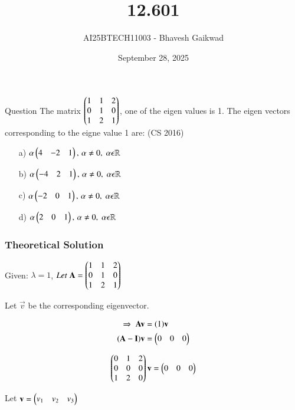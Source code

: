 \documentclass{beamer}
\title
{12.601}
\date{September 28, 2025}
\author 
{AI25BTECH11003 - Bhavesh Gaikwad}
\begin{document}
\frame{\titlepage}
\begin{frame}{Question}
The matrix $\begin{pmatrix}1 & 1 & 2 \\ 0 & 1 & 0 \\ 1 & 2 & 1\end{pmatrix}$, one of the eigen values is 1. The eigen vectors corresponding to the eigne value 1 are:
\hfill{(CS 2016)}\\

\begin{itemize}
    \item[a)] $\alpha\begin{pmatrix}4 & -2 & 1\end{pmatrix}, \, \alpha \neq 0, \; \alpha \epsilon \mathbb{R}$
    \item[b)] $\alpha\begin{pmatrix}-4 & 2 & 1\end{pmatrix}, \, \alpha \neq 0, \; \alpha \epsilon \mathbb{R}$
    \item[c)]$\alpha\begin{pmatrix}-2 & 0 & 1\end{pmatrix}, \, \alpha \neq 0, \; \alpha \epsilon \mathbb{R}$
    \item[d)]$\alpha\begin{pmatrix}2 & 0 & 1\end{pmatrix}, \, \alpha \neq 0, \; \alpha \epsilon \mathbb{R}$
\end{itemize}
\end{frame}


\begin{frame}[fragile]
    \frametitle{Theoretical Solution}
Given: $\lambda = 1$, $Let \; \mathbf{A} = \begin{pmatrix}1 & 1 & 2 \\ 0 & 1 & 0 \\ 1 & 2 & 1\end{pmatrix}$

Let $\vec{v}$ be the corresponding eigenvector.

\begin{align}
    \Rightarrow \; \mathbf{A}\mathbf{v} &= (1)\mathbf{v} \\ 
    (\mathbf{A} - \mathbf{I})\mathbf{v} &= \begin{pmatrix}0 & 0 & 0\end{pmatrix}
\end{align}

\begin{equation}
\begin{pmatrix}0 & 1 & 2 \\ 0 & 0 & 0 \\ 1 & 2 & 0\end{pmatrix}\mathbf{v} = \begin{pmatrix}0 & 0 & 0\end{pmatrix}    
\end{equation}

Let $\mathbf{v} = \begin{pmatrix}v_1 & v_2 & v_3\end{pmatrix}$\\
\end{frame}
\end{document}
